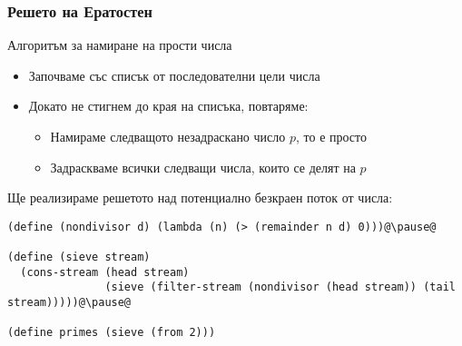 \documentclass[alsotrans]{beamerswitch}
\begin{document}
\begin{frame}[fragile]
  \frametitle{Решето на Ератостен}

  \pause
  Алгоритъм за намиране на прости числа
  \pause
  \begin{itemize}
  \item Започваме със списък от последователни цели числа
  \item Докато не стигнем до края на списъка, повтаряме:
    \begin{itemize}
    \item Намираме следващото незадраскано число $p$, то е просто
    \item Задраскваме всички следващи числа, които се делят на $p$
    \end{itemize}
  \end{itemize}
  \pause
  Ще реализираме решетото над потенциално безкраен поток от числа:
  \pause
\begin{lstlisting}
(define (nondivisor d) (lambda (n) (> (remainder n d) 0)))@\pause@

(define (sieve stream)
  (cons-stream (head stream)
               (sieve (filter-stream (nondivisor (head stream)) (tail stream)))))@\pause@

(define primes (sieve (from 2)))
\end{lstlisting}
\end{frame}
\end{document}
